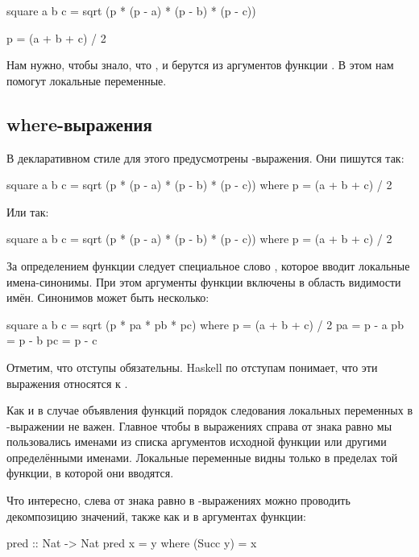 \begin{code}
square a b c = sqrt (p * (p - a) * (p - b) * (p - c))

p = (a + b + c) / 2
\end{code}

Нам нужно, чтобы  знало, что ,  и  берутся из
аргументов функции . В этом нам помогут локальные переменные.

\subsection{where-выражения}

В декларативном стиле для этого предусмотрены 
-выражения. Они пишутся так:


\begin{code}
square a b c = sqrt (p * (p - a) * (p - b) * (p - c))
    where p = (a + b + c) / 2
\end{code}

Или так:


\begin{code}
square a b c = sqrt (p * (p - a) * (p - b) * (p - c)) where 
    p = (a + b + c) / 2
\end{code}

За определением функции следует специальное слово , которое
вводит локальные имена-синонимы. При этом аргументы функции включены в
область видимости имён. Синонимов может быть несколько:


\begin{code}
square a b c = sqrt (p * pa * pb * pc)
    where p  = (a + b + c) / 2
          pa = p - a
          pb = p - b
          pc = p - c
\end{code}

Отметим, что отступы обязательны. Haskell по отступам понимает, что эти
выражения относятся к .

Как и в случае объявления функций порядок следования локальных
переменных в -выражении не важен. Главное чтобы в выражениях
справа от знака равно мы пользовались именами из списка аргументов
исходной функции или другими определёнными именами. Локальные переменные
видны только в пределах той функции, в которой они вводятся.

Что интересно, слева от знака равно в -выражениях можно
проводить декомпозицию значений, также как и в аргументах функции:


\begin{code}
pred :: Nat -> Nat
pred x = y
    where (Succ y) = x
\end{code}

